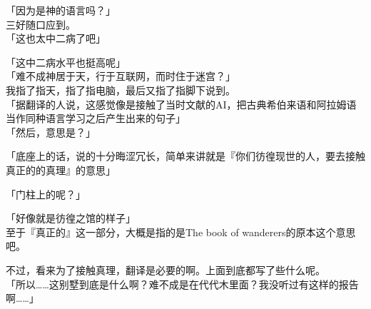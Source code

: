 「因为是神的语言吗？」\\

三好随口应到。\\

「这也太中二病了吧」

「这中二病水平也挺高呢」\\

「难不成神居于天，行于互联网，而时住于迷宫？」\\

我指了指天，指了指电脑，最后又指了指脚下说到。\\

「据翻译的人说，这感觉像是接触了当时文献的AI，把古典希伯来语和阿拉姆语当作同种语言学习之后产生出来的句子」\\

「然后，意思是？」

「底座上的话，说的十分晦涩冗长，简单来讲就是『你们彷徨现世的人，要去接触真正的的真理』的意思」

「门柱上的呢？」

「好像就是彷徨之馆的样子」\\

至于『真正的』这一部分，大概是指的是The book of wanderers的原本这个意思吧。

不过，看来为了接触真理，翻译是必要的啊。上面到底都写了些什么呢。\\

「所以……这别墅到底是什么啊？难不成是在代代木里面？我没听过有这样的报告啊……」\\

